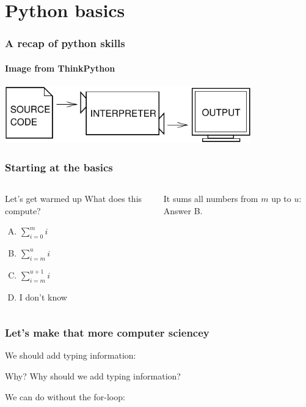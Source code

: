 \section{Python basics}
\label{sec:python_basics}

\begin{frame}
	\frametitle{A recap of python skills}
	\framesubtitle{Image from ThinkPython}
	\begin{center}
		\includegraphics[width=0.8\textwidth]{figures/interpret.pdf}
	\end{center}
\end{frame}

\begin{frame}
	\frametitle{Starting at the basics}
		
	\pause
	\begin{columns}
		\begin{questionblock}{Let's get warmed up}
			What does this compute?	
			\begin{multicols}{2}
				\begin{enumerate}[A.]
					\item $\sum\limits_{i=0}^{m} i$
					\item $\sum\limits_{i=m}^{u} i$
					\item $\sum\limits_{i=m}^{u+1} i$
					\item I don't know
				\end{enumerate}
			\end{multicols}
			\vspace*{0.2cm}
		\end{questionblock}
		\pause
		\begin{answerblock}{}
			It sums all numbers from $m$ up to $u$: Answer B.
		\end{answerblock}
	\end{columns}
\end{frame}

\begin{frame}
	\frametitle{Let's make that more computer sciencey}
	We should add typing information:
		
	\pause
	\begin{questionblock}{Why?}
		Why should we add typing information?
	\end{questionblock}

	\pause
	We can do without the for-loop:
		
\end{frame}

